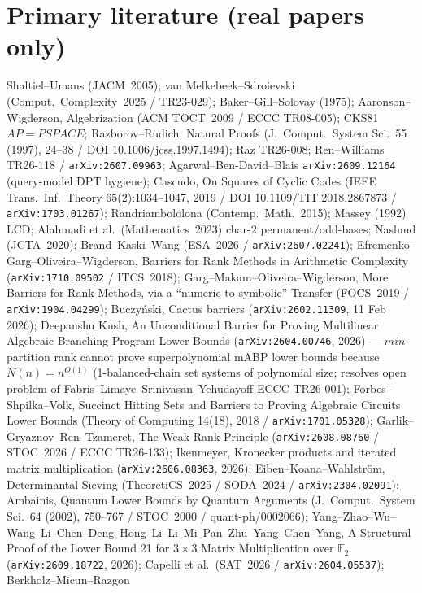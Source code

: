 \documentclass[11pt]{article}
\begin{document}
\section*{Primary literature (real papers only)}
Shaltiel--Umans (JACM~2005); van Melkebeek--Sdroievski (Comput.\ Complexity~2025 /
TR23-029); Baker--Gill--Solovay (1975); Aaronson--Wigderson, Algebrization
(ACM TOCT~2009 / ECCC TR08-005); CKS81 $AP=PSPACE$; Razborov--Rudich, Natural
Proofs (J.\ Comput.\ System Sci.\ 55 (1997), 24--38 / DOI 10.1006/jcss.1997.1494);
Raz TR26-008; Ren--Williams TR26-118 / \texttt{arXiv:2607.09963};
Agarwal--Ben-David--Blais \texttt{arXiv:2609.12164} (query-model DPT hygiene);
Cascudo, On Squares of Cyclic Codes (IEEE Trans.\ Inf.\ Theory 65(2):1034--1047,
2019 / DOI 10.1109/TIT.2018.2867873 / \texttt{arXiv:1703.01267});
Randriambololona (Contemp.\ Math.\ 2015); Massey (1992) LCD;
Alahmadi et al.\ (Mathematics~2023) char-$2$ permanent/odd-bases;
Naslund (JCTA~2020); Brand--Kaski--Wang (ESA~2026 / \texttt{arXiv:2607.02241});
Efremenko--Garg--Oliveira--Wigderson, Barriers for Rank Methods in Arithmetic
Complexity (\texttt{arXiv:1710.09502} / ITCS~2018);
Garg--Makam--Oliveira--Wigderson, More Barriers for Rank Methods, via a
``numeric to symbolic'' Transfer (FOCS~2019 / \texttt{arXiv:1904.04299});
Buczy\'nski, Cactus barriers (\texttt{arXiv:2602.11309}, 11 Feb 2026);
Deepanshu Kush, An Unconditional Barrier for Proving Multilinear Algebraic
Branching Program Lower Bounds (\texttt{arXiv:2604.00746}, 2026) ---
$min$-partition rank cannot prove superpolynomial mABP lower bounds because
$N(n)=n^{O(1)}$ (1-balanced-chain set systems of polynomial size; resolves open
problem of Fabris--Limaye--Srinivasan--Yehudayoff ECCC TR26-001);
Forbes--Shpilka--Volk, Succinct Hitting Sets and Barriers to Proving Algebraic
Circuits Lower Bounds (Theory of Computing 14(18), 2018 /
\texttt{arXiv:1701.05328});
Garlik--Gryaznov--Ren--Tzameret, The Weak Rank Principle
(\texttt{arXiv:2608.08760} / STOC~2026 / ECCC TR26-133);
Ikenmeyer, Kronecker products and iterated matrix multiplication
(\texttt{arXiv:2606.08363}, 2026);
Eiben--Koana--Wahlstr\"om, Determinantal Sieving (TheoretiCS~2025 / SODA~2024 /
\texttt{arXiv:2304.02091});
Ambainis, Quantum Lower Bounds by Quantum Arguments (J.\ Comput.\ System Sci.\ 64
(2002), 750--767 / STOC~2000 / quant-ph/0002066);
Yang--Zhao--Wu--Wang--Li--Chen--Deng--Hong--Li--Li--Mi--Pan--Zhu--Yang--Chen--Yang,
A Structural Proof of the Lower Bound 21 for $3\times 3$ Matrix Multiplication
over $\mathbb F_2$ (\texttt{arXiv:2609.18722}, 2026);
Capelli et al.\ (SAT~2026 / \texttt{arXiv:2604.05537}); Berkholz--Micun--Razgon
\end{document}
